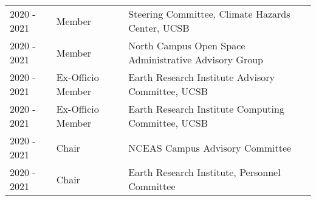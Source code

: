 \begin{longtable}{llp{12cm}}
2020 - 2021 & Member & Steering Committee, Climate Hazards Center, UCSB \\
2020 - 2021 & Member & North Campus Open Space Administrative Advisory Group \\
2020 - 2021 & Ex-Officio Member & Earth Research Institute Advisory Committee, UCSB \\
2020 - 2021 & Ex-Officio Member & Earth Research Institute Computing Committee, UCSB \\
2020 - 2021 & Chair & NCEAS Campus Advisory Committee  \\
2020 - 2021 & Chair & Earth Research Institute, Personnel Committee \\
\end{longtable}


